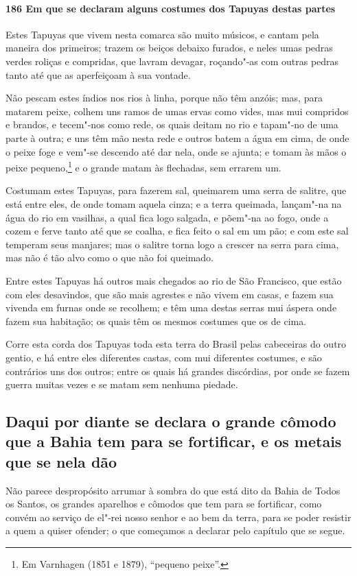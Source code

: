 \begin{linenumbers}
\paragraph{186 Em que se declaram alguns costumes dos Tapuyas destas partes}\quad
Estes Tapuyas que vivem nesta comarca são muito músicos, e cantam pela maneira dos
primeiros; trazem os beiços debaixo furados, e neles umas pedras verdes roliças e
compridas, que lavram devagar, roçando"-as com outras pedras tanto até que as aperfeiçoam à
sua vontade.

Não pescam estes índios nos rios à linha, porque não têm anzóis; mas, para matarem peixe,
colhem uns ramos de umas ervas como vides, mas mui compridos e brandos, e tecem"-nos como
rede, os quais deitam no rio e tapam"-no de uma parte à outra; e uns têm mão nesta rede e
outros batem a água em cima, de onde o peixe foge e vem"-se descendo até dar nela, onde se
ajunta; e tomam às mãos o peixe pequeno,\footnote{ Em Varnhagen (1851 e 1879), ``pequeno
peixe''.} e o grande matam às flechadas, sem errarem um.

Costumam estes Tapuyas, para fazerem sal, queimarem uma serra de salitre, que está entre
eles, de onde tomam aquela cinza; e a terra queimada, lançam"-na na água do rio em
vasilhas, a qual fica logo salgada, e põem"-na ao fogo, onde a cozem e ferve tanto até que
se coalha, e fica feito o sal em um pão; e com este sal temperam seus manjares; mas o
salitre torna logo a crescer na serra para cima, mas não é tão alvo como o que não foi
queimado.

Entre estes Tapuyas há outros mais chegados ao rio de São Francisco, que estão com eles
desavindos, que são mais agrestes e não vivem em casas, e fazem sua vivenda em furnas onde
se recolhem; e têm uma destas serras mui áspera onde fazem sua habitação; os quais têm os
mesmos costumes que os de cima.

Corre esta corda dos Tapuyas toda esta terra do Brasil pelas cabeceiras do outro gentio, e
há entre eles diferentes castas, com mui diferentes costumes, e são contrários uns dos
outros; entre os quais há grandes discórdias, por onde se fazem guerra muitas vezes e se
matam sem nenhuma piedade.

\subsection{Daqui por diante se declara o grande cômodo que a Bahia tem para se
fortificar, e os metais que se nela dão}

Não parece despropósito arrumar à sombra do que está dito da Bahia de Todos os Santos, os
grandes aparelhos e cômodos que tem para se fortificar, como convém ao serviço de el"-rei
nosso senhor e ao bem da terra, para se poder resistir a quem a quiser ofender; o que
começamos a declarar pelo capítulo que se segue.


\end{linenumbers}
